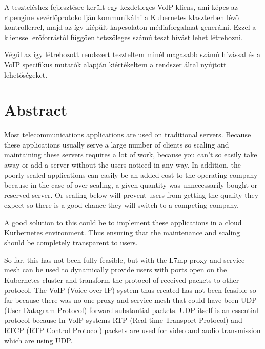 A teszteléshez fejlesztésre került egy kezdetleges VoIP kliens, ami képes az 
rtpengine vezérlőprotokollján kommunikálni a Kubernetes klaszterben lévő kontrollerrel, 
majd az így kiépült kapcsolaton médiaforgalmat generálni. Ezzel a klienssel 
erőforrástól függően tetszőleges számú teszt hívást lehet létrehozni. 

Végül az így létrehozott rendszert teszteltem minél magasabb számú hívással és a 
VoIP specifikus mutatók alapján kiértékeltem a rendszer által nyújtott lehetőségeket. 

\vfill
\selectenglish


\chapter*{Abstract}

Most telecommunications applications are used on traditional servers. Because these 
applications usually serve a large number of clients
so scaling and maintaining these servers requires a lot of work,
because you can’t so easily take away or add a server without the users noticed in
any way. In addition, the poorly scaled
applications can easily be an added cost to the operating company because
in the case of over scaling, a given quantity was unnecessarily bought or reserved
server. Or scaling below will prevent users from getting the quality they expect
so there is a good chance they will switch to a competing company.

A good solution to this could be to implement these applications
in a cloud Kurbernetes environment. Thus ensuring that the maintenance and
scaling should be completely transparent to users.

So far, this has not been fully feasible, but with the L7mp proxy and
service mesh can be used to dynamically provide users with ports
open on the Kubernetes cluster and transform the protocol of received packets to
other protocol. The VoIP (Voice over IP) system thus created has not been feasible so far 
because there was no one
proxy and service mesh that could have been UDP (User Datagram Protocol)
forward substantial packets. UDP itself is an essential protocol because
In VoIP systems RTP (Real-time Transport Protocol) and
RTCP (RTP Control Protocol) packets are used for video and
audio transmission which are using UDP.

